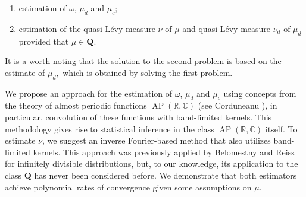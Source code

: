 \documentclass[numbers,webpdf,imaiai]{ima-authoring-template}%
\theoremstyle{thmstyletwo}%
\newcommand{\R}{\mathbb{R}}
\newcommand{\C}{\mathbb{C}}
\newcommand{\Q}{\pmb{Q}}
\newcommand{\w}{\omega}
\newcommand{\AP}{\operatorname{AP}}
\numberwithin{equation}{section}
\begin{document}

 
\begin{enumerate}
\item  estimation of $\w$, $\mu_d$ and $\mu_c$;%
\item  estimation of the quasi-L{\'e}vy measure $\nu$ of $\mu$ and quasi-L{\'e}vy measure $\nu_d$ of $\mu_d$ provided that \(\mu \in \Q\). %
\end{enumerate}
It is a worth noting that the solution to the second problem is based on the estimate of \(\mu_d,\) which is obtained by solving the first problem.

We propose an approach for the estimation of $\w$, $\mu_d$ and $\mu_c$%
using concepts from the theory
of almost periodic functions \(\AP(\R, \C)\) %
(see Corduneanu \cite{Cord2009}), in particular, convolution of these functions with band-limited kernels. This methodology gives rise to statistical inference in the class \(\AP(\R, \C)\) itself. 
To estimate \(\nu\), we suggest
an inverse Fourier-based method that also utilizes band-limited kernels. This approach
was previously applied by Belomestny and Reiss \cite{BR2015} for infinitely divisible distributions, but, to our knowledge,
its application to the class \(\Q\) has never been considered before. We demonstrate that both estimators achieve polynomial rates of convergence
given some assumptions on \(\mu\). 
\end{document}
